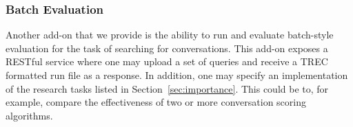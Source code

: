 \subsubsection{Batch Evaluation}

Another add-on that we provide is the ability to run and evaluate batch-style evaluation for the task of searching for conversations. This add-on exposes a RESTful service where one may upload a set of queries and receive a TREC formatted run file as a response. In addition, one may specify an implementation of the research tasks listed in Section~\ref{sec:importance}. This could be to, for example, compare the effectiveness of two or more conversation scoring algorithms. 


%




